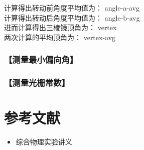 \documentclass{ctexart}
\let\oldsubsubsection\subsubsection
\renewcommand{\subsubsection}[1]{\oldsubsubsection{\!\!\!\!\!\!【#1】}}
\begin{document}
计算得出转动前角度平均值为：{{ angle-a-avg }} \\
计算得出转动后角度平均值为：{{ angle-b-avg }} \\
进而计算得出三棱镜顶角为：{{ vertex }} \\
两次计算的平均顶角为：{{ vertex-avg }}

\subsubsection{测量最小偏向角}

\subsubsection{测量光栅常数}

\section{参考文献}
\begin{itemize}[leftmargin=0pt]
  \item[] 综合物理实验讲义
\end{itemize}
\end{document}
